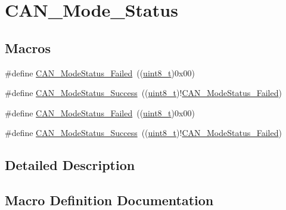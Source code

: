 \hypertarget{group___c_a_n___mode___status}{}\section{C\+A\+N\+\_\+\+Mode\+\_\+\+Status}
\label{group___c_a_n___mode___status}
\subsection*{Macros}
\begin{DoxyCompactItemize}
\item 
\#define \hyperlink{group___c_a_n___mode___status_ga9882944537945325ef08e1986838ea45}{C\+A\+N\+\_\+\+Mode\+Status\+\_\+\+Failed}~((\hyperlink{_p_e___types_8h_aba7bc1797add20fe3efdf37ced1182c5}{uint8\+\_\+t})0x00)
\item 
\#define \hyperlink{group___c_a_n___mode___status_ga7ca0ea503eb3b3a7c0abdfad27cb6579}{C\+A\+N\+\_\+\+Mode\+Status\+\_\+\+Success}~((\hyperlink{_p_e___types_8h_aba7bc1797add20fe3efdf37ced1182c5}{uint8\+\_\+t})!\hyperlink{group___c_a_n___mode___status_ga9882944537945325ef08e1986838ea45}{C\+A\+N\+\_\+\+Mode\+Status\+\_\+\+Failed})
\item 
\#define \hyperlink{group___c_a_n___mode___status_ga9882944537945325ef08e1986838ea45}{C\+A\+N\+\_\+\+Mode\+Status\+\_\+\+Failed}~((\hyperlink{_p_e___types_8h_aba7bc1797add20fe3efdf37ced1182c5}{uint8\+\_\+t})0x00)
\item 
\#define \hyperlink{group___c_a_n___mode___status_ga7ca0ea503eb3b3a7c0abdfad27cb6579}{C\+A\+N\+\_\+\+Mode\+Status\+\_\+\+Success}~((\hyperlink{_p_e___types_8h_aba7bc1797add20fe3efdf37ced1182c5}{uint8\+\_\+t})!\hyperlink{group___c_a_n___mode___status_ga9882944537945325ef08e1986838ea45}{C\+A\+N\+\_\+\+Mode\+Status\+\_\+\+Failed})
\end{DoxyCompactItemize}


\subsection{Detailed Description}


\subsection{Macro Definition Documentation}
